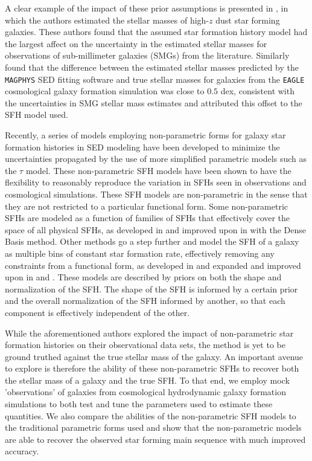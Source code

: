 \documentclass[twocolumn]{aastex62}
\begin{document}
A clear example of the impact of these prior assumptions is presented in \citet{michalowski_stellar_2012}, in which the authors estimated the stellar masses of high-$z$ dust star forming galaxies. These authors found that the assumed star formation history model had the largest affect on the uncertainty in the estimated stellar masses for observations of sub-millimeter galaxies (SMGs) from the literature. Similarly \cite{dudzeviciute_alma_2019} found that the difference between the estimated stellar masses predicted by the \texttt{MAGPHYS} SED fitting software and true stellar masses for galaxies from the \texttt{EAGLE} cosmological galaxy formation simulation was close to $0.5$ dex, consistent with the uncertainties in \citet{michalowski_stellar_2012} SMG stellar mass estimates and attributed this offset to the SFH model used.

Recently, a series of models employing non-parametric forms for galaxy star formation histories in SED modeling have been developed to minimize the uncertainties propagated by the use of more simplified parametric models such as the $\tau$ model.  These non-parametric SFH models have been shown to have the flexibility to reasonably reproduce the variation in SFHs seen in observations and cosmological simulations. These SFH models are non-parametric in the sense that they are not restricted to a particular functional form. Some non-parametric SFHs are modeled as a function of families of SFHs that effectively cover the space of all physical SFHs, as developed in \cite{iyer_reconstruction_2017} and improved upon in \cite{iyer_nonparametric_2019} with the Dense Basis method. Other methods go a step further and model the SFH of a galaxy as multiple bins of constant star formation rate, effectively removing any constraints from a functional form, as developed in \cite{leja_deriving_2017} and expanded and improved upon in \cite{leja_how_2019} and \cite{leja_older_2019}. These models are described by priors on both the shape and normalization of the SFH. The shape of the SFH is informed by a certain prior and the overall normalization of the SFH informed by another, so that each component is effectively independent of the other.   

While the aforementioned authors explored the impact of non-parametric star formation histories on their observational data sets, the method is yet to be ground truthed against the true stellar mass of the galaxy. An important avenue to explore is therefore the ability of these non-parametric SFHs to recover both the stellar mass of a galaxy and the true SFH. To that end, we employ mock 'observations' of galaxies from cosmological hydrodynamic galaxy formation simulations to both test and tune the parameters used to estimate these quantities. We also compare the abilities of the non-parametric SFH models to the traditional parametric forms used and show that the non-parametric models are able to recover the observed star forming main sequence with much improved accuracy.   
\end{document}
